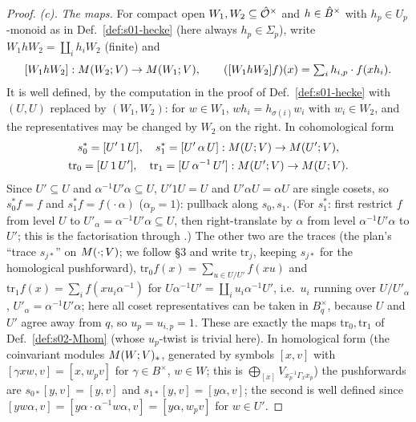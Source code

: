 \begin{proof}
\emph{(c).} \emph{The maps.} For compact open $W_1,W_2\subseteq\hat{\mathcal{O}}^\times$ and $h\in\hat{B}^\times$ with $h_p\in U_p$-monoid as in
Def.~\ref{def:s01-hecke} (here always $h_p\in\Sigma_p$), write $W_1hW_2=\coprod_ih_iW_2$ (finite) and
\[[W_1hW_2]:M(W_2;V)\to M(W_1;V),\qquad([W_1hW_2]f)(x)=\textstyle\sum_ih_{i,p}\cdot f(xh_i).\]
It is well defined, by the computation in the proof of Def.~\ref{def:s01-hecke} with $(U,U)$ replaced by $(W_1,W_2)$: for $w\in W_1$,
$wh_i=h_{\sigma(i)}w_i$ with $w_i\in W_2$, and the representatives may be changed by $W_2$ on the right. In cohomological form
\begin{gather*}s_0^*=[U'\,1\,U],\quad s_1^*=[U'\,\alpha\,U]:M(U;V)\to M(U';V),\\
\mathrm{tr}_0=[U\,1\,U'],\quad \mathrm{tr}_1=[U\,\alpha^{-1}\,U']:M(U';V)\to M(U;V).\end{gather*}
Since $U'\subseteq U$ and $\alpha^{-1}U'\alpha\subseteq U$, $U'1U=U$ and $U'\alpha U=\alpha U$ are single cosets, so $s_0^*f=f$ and
$s_1^*f=f(\cdot\,\alpha)$ ($\alpha_p=1$): pullback along $s_0,s_1$. (For $s_1^*$: first restrict $f$ from level $U$ to
$U'_\alpha=\alpha^{-1}U'\alpha\subseteq U$, then right-translate by $\alpha$ from level $\alpha^{-1}U'\alpha$ to $U'$; this is the
factorisation  through .) The other two are the traces (the plan's ``trace $s_{j*}$'' on $M(\cdot;V)$; we follow \S3 and write $\mathrm{tr}_j$, keeping
$s_{j*}$ for the homological pushforward),
$\mathrm{tr}_0f(x)=\sum_{u\in U/U'}f(xu)$ and $\mathrm{tr}_1f(x)=\sum_if(xu_i\alpha^{-1})$ for $U\alpha^{-1}U'=\coprod_iu_i\alpha^{-1}U'$,
i.e.\ $u_i$ running over $U/U'_\alpha$, $U'_\alpha=\alpha^{-1}U'\alpha$; here all coset representatives can be taken in $B_q^\times$,
because $U$ and $U'$ agree away from $q$, so $u_p=u_{i,p}=1$. These are exactly the maps $\mathrm{tr}_0,\mathrm{tr}_1$ of
Def.~\ref{def:s02-Mhom} (whose $u_p$-twist is trivial here). In homological form (the coinvariant modules
$M(W;V)_*$, generated by symbols $[x,v]$ with $[\gamma xw,v]=[x,w_pv]$ for $\gamma\in B^\times$, $w\in W$; this is
$\bigoplus_{[x]}V_{x_p^{-1}\Gamma_xx_p}$) the pushforwards are $s_{0*}[y,v]=[y,v]$ and $s_{1*}[y,v]=[y\alpha,v]$; the second is well
defined since $[yw\alpha,v]=[y\alpha\cdot\alpha^{-1}w\alpha,v]=[y\alpha,w_pv]$ for $w\in U'$.


\end{proof}
